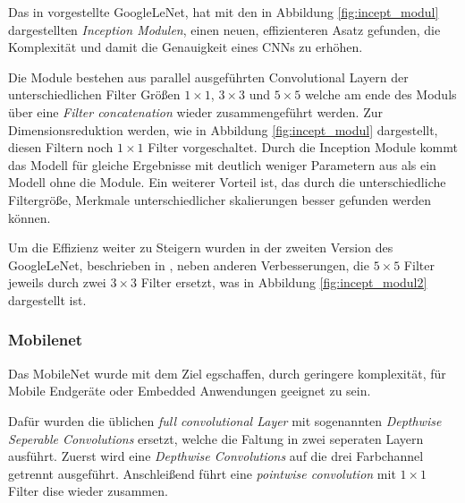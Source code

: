 Das in \cite{szegedyGoingDeeperConvolutions2014} 
vorgestellte GoogleLeNet, hat mit den in 
Abbildung \ref{fig:incept_modul} dargestellten
\textit{Inception Modulen}, einen neuen, 
effizienteren Asatz gefunden, die 
Komplexität und damit die Genauigkeit eines 
CNNs zu erhöhen.

Die Module bestehen aus parallel ausgeführten 
Convolutional Layern der unterschiedlichen Filter 
Größen $1\times1$, $3\times3$ und $5\times5$ welche 
am ende des Moduls über eine \textit{Filter 
concatenation} wieder zusammengeführt werden.
Zur Dimensionsreduktion werden, wie in 
Abbildung \ref{fig:incept_modul} dargestellt,
diesen Filtern noch $1\times1$ Filter vorgeschaltet.
Durch die Inception Module kommt das Modell 
für gleiche Ergebnisse mit deutlich weniger 
Parametern aus als ein Modell ohne die Module.
Ein weiterer Vorteil ist, das durch die 
unterschiedliche Filtergröße, Merkmale 
unterschiedlicher skalierungen besser gefunden 
werden können.

Um die Effizienz weiter zu Steigern wurden in 
der zweiten Version des GoogleLeNet, beschrieben in
\cite{szegedyRethinkingInceptionArchitecture2015},
neben anderen Verbesserungen, die 
$ 5\times5$ Filter jeweils durch zwei $3\times3$ Filter 
ersetzt, was in Abbildung \ref{fig:incept_modul2}
dargestellt ist.



\vspace{1cm}
\begin{minipage}{0.5\textwidth}
    \centering
    
    \label{fig:incept_modul}
\end{minipage}
\begin{minipage}{0.5\textwidth}
    \centering
    
    \label{fig:incept_modul2}
\end{minipage}




\subsubsection{Mobilenet}


Das MobileNet \cite{howardMobileNetsEfficientConvolutional2017a}
wurde mit dem Ziel egschaffen, durch geringere 
komplexität, für Mobile Endgeräte oder Embedded Anwendungen 
geeignet zu sein.

Dafür wurden die üblichen \textit{full convolutional Layer}
mit sogenannten \textit{Depthwise Seperable 
Convolutions} ersetzt, welche die Faltung in zwei seperaten 
Layern ausführt. Zuerst wird eine \textit{Depthwise  
Convolutions} auf die drei Farbchannel getrennt ausgeführt.
Anschleißend führt eine \textit{pointwise convolution}
mit $1\times1$ Filter dise wieder zusammen.



